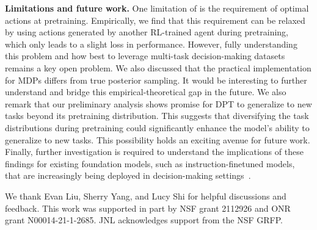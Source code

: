 \documentclass{article}
\begin{document}
\textbf{Limitations and future work. } 
One limitation of \macroName{} is the requirement of optimal actions at pretraining. Empirically, we find that this requirement can be relaxed by using actions generated by another RL-trained agent during pretraining, which only leads to a slight loss in performance. However, fully understanding this problem and how best to leverage multi-task decision-making datasets remains a key open problem. 
We also discussed that the practical implementation for MDPs differs from true posterior sampling. It would be interesting to further understand and bridge this empirical-theoretical gap in the future.
We also remark that our preliminary analysis shows promise for DPT to generalize to new tasks beyond its pretraining distribution. This suggests that diversifying the task distributions during pretraining could significantly enhance the model's ability to generalize to new tasks. This possibility holds an exciting avenue for future work. Finally, further investigation is required to understand the implications of these findings for existing foundation models, such as instruction-finetuned models, that are increasingly being deployed in decision-making settings~\citep{wang2023voyager}.

\begin{ack}
We thank Evan Liu, Sherry Yang, and Lucy Shi for helpful discussions and feedback. This work was supported in part by NSF grant 2112926 and ONR grant N00014-21-1-2685. JNL acknowledges support from the NSF GRFP.
\end{ack}










\end{document}

